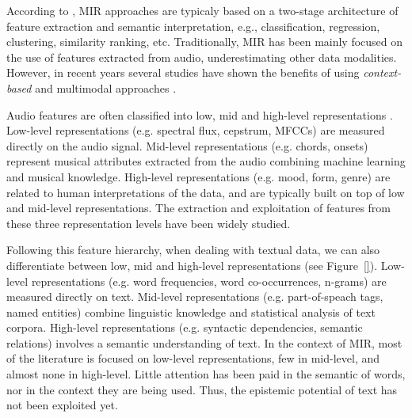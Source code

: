 According to \cite{humphrey2012}, MIR approaches are typicaly based on a two-stage architecture of feature extraction and semantic interpretation, e.g., classification, regression, clustering, similarity ranking, etc. 
Traditionally, MIR has been mainly focused on the use of features extracted from audio, underestimating other data modalities. However, in recent years several studies have shown the benefits of using \textit{context-based} and multimodal approaches \cite{Schedl2014}. 

Audio features are often classified into low, mid and high-level representations \cite{bello2015}. Low-level representations (e.g. spectral flux, cepstrum, MFCCs) are measured directly on the audio signal. Mid-level representations (e.g. chords, onsets) represent musical attributes extracted from the audio combining machine learning and musical knowledge. High-level representations (e.g. mood, form, genre) are related to human interpretations of the data, and are typically built on top of low and mid-level representations. The extraction and exploitation of features from these three representation levels have been widely studied. 

Following this feature hierarchy, when dealing with textual data, we can also differentiate between low, mid and high-level representations (see Figure~\ref{}). Low-level representations (e.g. word frequencies, word co-occurrences, n-grams) are measured directly on text. Mid-level representations (e.g. part-of-speach tags, named entities) combine linguistic knowledge and statistical analysis of text corpora. High-level representations (e.g. syntactic dependencies, semantic relations) involves a semantic understanding of text. In the context of MIR, most of the literature is focused on low-level representations, few in mid-level, and almost none in high-level. Little attention has been paid in the semantic of words, nor in the context they are being used. Thus, the epistemic potential of text has not been exploited yet.


